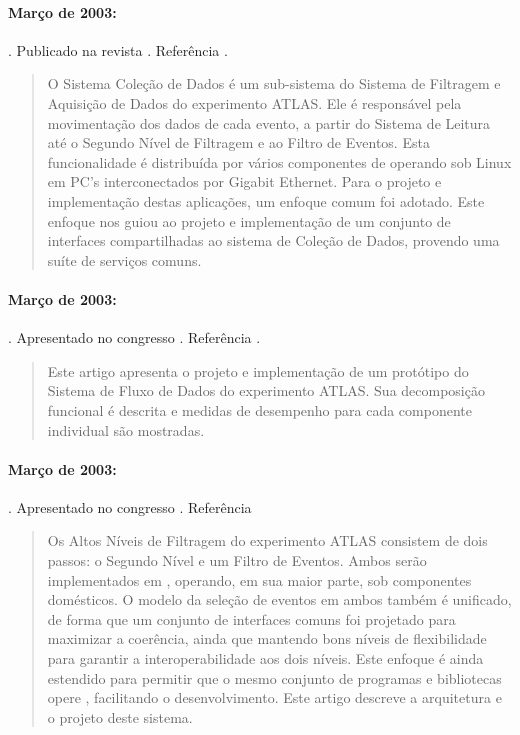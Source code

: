 \paragraph{Março de 2003: }. Publicado
na revista . Referência
\cite{aa:rt-2003}.

\begin{quotation}
O Sistema Coleção de Dados é um sub-sistema do Sistema de Filtragem e
Aquisição de Dados do experimento ATLAS. Ele é responsável pela movimentação
dos dados de cada evento, a partir do Sistema de Leitura até o Segundo Nível
de Filtragem e ao Filtro de Eventos. Esta funcionalidade é distribuída por
vários componentes de  operando sob Linux em PC's
interconectados por Gigabit Ethernet. Para o projeto e implementação destas
aplicações, um enfoque comum foi adotado. Este enfoque nos guiou ao projeto e
implementação de um conjunto de interfaces compartilhadas ao sistema de
Coleção de Dados, provendo uma suíte de serviços comuns.
\end{quotation}

\paragraph{Março de 2003: }. Apresentado no congresso . Referência \cite{aa:chep-2003-2}.

\begin{quotation}
Este artigo apresenta o projeto e implementação de um protótipo do Sistema de
Fluxo de Dados do experimento ATLAS. Sua decomposição funcional é descrita e
medidas de desempenho para cada componente individual são mostradas.
\end{quotation}

\paragraph{Março de 2003: }. Apresentado no congresso
. Referência
\cite{aa:chep-2003-3}

\begin{quotation}
Os Altos Níveis de Filtragem do experimento ATLAS consistem de dois passos: o
Segundo Nível e um Filtro de Eventos. Ambos serão implementados em
, operando, em sua maior parte, sob componentes domésticos. O
modelo da seleção de eventos em ambos também é unificado, de forma que um
conjunto de interfaces comuns foi projetado para maximizar a coerência, ainda
que mantendo bons níveis de flexibilidade para garantir a interoperabilidade
aos dois níveis. Este enfoque é ainda estendido para permitir que o mesmo
conjunto de programas e bibliotecas opere , facilitando o
desenvolvimento. Este artigo descreve a arquitetura e o projeto deste sistema.
\end{quotation}

